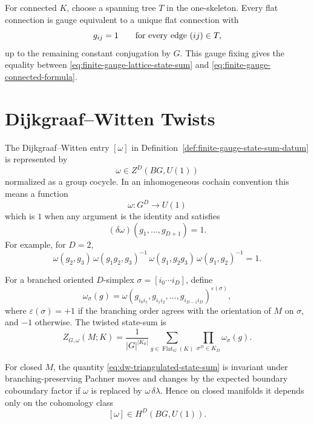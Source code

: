 For connected \(K\), choose a spanning tree \(T\) in the one-skeleton.  Every
flat connection is gauge equivalent to a unique flat connection with
\[
  g_{ij}=1
  \qquad\hbox{for every edge }(ij)\in T,
\]
up to the remaining constant conjugation by \(G\).  This gauge fixing gives
the equality between \eqref{eq:finite-gauge-lattice-state-sum} and
\eqref{eq:finite-gauge-connected-formula}.

\section{Dijkgraaf--Witten Twists}

The Dijkgraaf--Witten entry \([\omega]\) in
Definition~\ref{def:finite-gauge-state-sum-datum} is represented by
\[
  \omega\in Z^D(BG,U(1))
\]
normalized as a group cocycle.  In an inhomogeneous cochain convention this
means a function
\[
  \omega:G^D\to U(1)
\]
which is \(1\) when any argument is the identity and satisfies
\begin{equation}
  (\delta\omega)(g_1,\ldots,g_{D+1})=1.
  \label{eq:dw-cocycle-condition}
\end{equation}
For example, for \(D=2\),
\begin{equation}
  \omega(g_2,g_3)\,
  \omega(g_1g_2,g_3)^{-1}\,
  \omega(g_1,g_2g_3)\,
  \omega(g_1,g_2)^{-1}
  =
  1.
  \label{eq:dw-2-cocycle-condition}
\end{equation}

For a branched oriented \(D\)-simplex
\(\sigma=[i_0\cdots i_D]\), define
\begin{equation}
  \omega_\sigma(g)
  =
  \omega(g_{i_0i_1},g_{i_1i_2},\ldots,g_{i_{D-1}i_D})^{\varepsilon(\sigma)},
  \label{eq:dw-simplex-weight}
\end{equation}
where \(\varepsilon(\sigma)=+1\) if the branching order agrees with the
orientation of \(M\) on \(\sigma\), and \(-1\) otherwise.  The twisted
state-sum is
\begin{equation}
  Z_{G,\omega}(M;K)
  =
  \frac{1}{|G|^{|K_0|}}
  \sum_{g\in\operatorname{Flat}_G(K)}
  \prod_{\sigma^D\in K_D}\omega_\sigma(g).
  \label{eq:dw-triangulated-state-sum}
\end{equation}

\begin{proposition}
\label{prop:dw-triangulation-independence}
For closed \(M\), the quantity
\eqref{eq:dw-triangulated-state-sum} is invariant under branching-preserving
Pachner moves and changes by the expected boundary coboundary factor if
\(\omega\) is replaced by \(\omega\,\delta\lambda\).  Hence on closed
manifolds it depends only on the cohomology class
\[
  [\omega]\in H^D(BG,U(1)).
\]
\end{proposition}

